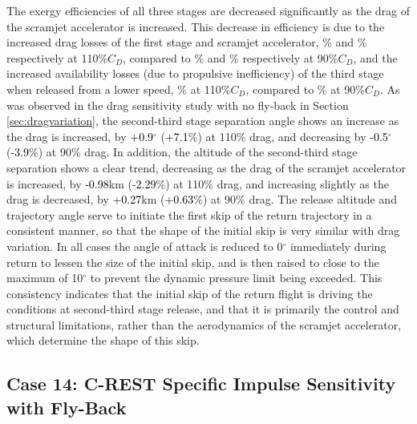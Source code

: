 The exergy efficiencies of all three stages are decreased significantly as the drag of the scramjet accelerator is increased. This decrease in efficiency is due to the increased drag losses of the first stage and scramjet accelerator, \WDoneCdOneHundredTen\% and \WDsecondCdOneHundredTen\% respectively at 110\%$C_D$, compared to \WDoneCdNinety\% and \WDsecondCdNinety\% respectively at 90\%$C_D$, and the increased availability losses (due to propulsive inefficiency) of the third stage when released from a lower speed, \PlossthreeCdOneHundredTen\% at 110\%$C_D$, compared to \PlossthreeCdNinety \% at 90\%$C_D$.
As was observed in the drag sensitivity study with no fly-back in Section \ref{sec:dragvariation}, the second-third stage separation angle shows an increase as the drag is increased, by \textcolor{black}{+0.9}$^\circ$ (\textcolor{black}{+7.1}\%) at 110\% drag, and decreasing by \textcolor{black}{-0.5}$^\circ$ (\textcolor{black}{-3.9}\%) at 90\% drag. In addition, the altitude of the second-third stage separation shows a clear trend, decreasing as the drag of the scramjet accelerator is increased, by \textcolor{black}{-0.98}km (-\textcolor{black}{2.29}\%) at 110\% drag, and increasing slightly as the drag is decreased, by \textcolor{black}{+0.27}km (\textcolor{black}{+0.63}\%) at 90\% drag.  
The release altitude and trajectory angle serve to initiate the first skip of the return trajectory in a consistent manner, so that the shape of the initial skip is very similar with drag variation. In all cases the angle of attack is reduced to 0$^\circ$ immediately during return to lessen the size of the initial skip, and is then raised to close to the maximum of 10$^\circ$ to prevent the dynamic pressure limit being exceeded. This consistency indicates that the initial skip of the return flight is driving the conditions at second-third stage release, and that it is primarily the control and structural limitations, rather than the aerodynamics of the scramjet accelerator, which determine the shape of this skip.


\subsection{Case 14: C-REST Specific Impulse Sensitivity with Fly-Back}


